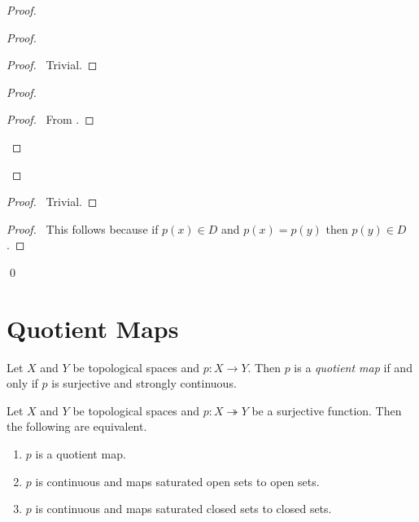 \begin{proof}
    \pf
    \begin{proof}
        \begin{proof}
            \pf\ Trivial.
        \end{proof}
        \begin{proof}
            \begin{proof}
                \pf\ From .
            \end{proof}
        \end{proof}
    \end{proof}
    \begin{proof}
        \pf\ Trivial.
    \end{proof}
    \begin{proof}
        \pf\ This follows because if $p(x) \in D$ and $p(x) = p(y)$ then $p(y) \in D$.
    \end{proof}
    \qed
\end{proof}

\section{Quotient Maps}

\begin{definition}
    Let $X$ and $Y$ be topological spaces and $p : X \rightarrow Y$. Then $p$ is a \emph{quotient map} if and only if $p$ is surjective and strongly continuous.
\end{definition}

\begin{proposition}
    \label{proposition:quotient_map}
    Let $X$ and $Y$ be topological spaces and $p : X \twoheadrightarrow Y$ be a surjective function. Then the following are equivalent.
    \begin{enumerate}
        \item $p$ is a quotient map.
        \item $p$ is continuous and maps saturated open sets to open sets.
        \item $p$ is continuous and maps saturated closed sets to closed sets.
    \end{enumerate}
\end{proposition}

